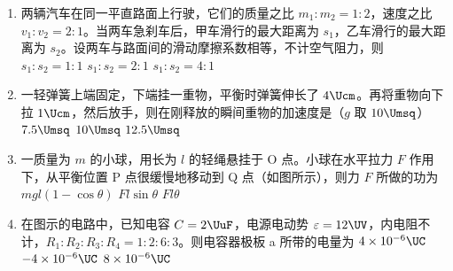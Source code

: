 \documentclass[\gkver]{gaokaozhenti}
\begin{document}
\begin{enumerate}
\item
两辆汽车在同一平直路面上行驶，它们的质量之比 $m_{1}:m_{2}=1:2$，速度之比 $v_{1}:v_{2}=2:1$。当两车急刹车后，甲车滑行的最大距离为 $s_{1}$，乙车滑行的最大距离为 $s_{2}$。设两车与路面间的滑动摩擦系数相等，不计空气阻力，则
{$s_{1}:s_{2}=1:1$}
{$s_{1}:s_{2}=2:1$}
{$s_{1}:s_{2}=4:1$}


\item
一轻弹簧上端固定，下端挂一重物，平衡时弹簧伸长了 $4\Ucm$。再将重物向下拉 $1\Ucm$，然后放手，则在刚释放的瞬间重物的加速度是（$g$ 取 $10\Umsq$）
\fourchoices[answer=A]
{$2.5\Umsq$}
{$7.5\Umsq$}
{$10\Umsq$}
{$12.5\Umsq$}


\item
一质量为 $m$ 的小球，用长为 $l$ 的轻绳悬挂于 O 点。小球在水平拉力 $F$ 作用下，从平衡位置 P 点很缓慢地移动到 Q 点（如图所示），则力 $F$ 所做的功为
\onepicture[w=3.50cm]{}
{$mgl(1-\cos\theta)$}
{$Fl\sin\theta$}
{$Fl\theta$}


\item
在图示的电路中，已知电容 $C=2\UuF$，电源电动势 $\varepsilon=12\UV$，内电阻不计，$R_{1}:R_{2}:R_{3}:R_{4}=1:2:6:3$。则电容器极板 a 所带的电量为
{$4\times10^{-6}\UC$}
{$-4\times10^{-6}\UC$}
{$8\times10^{-6}\UC$}


\end{enumerate}
\end{document}

